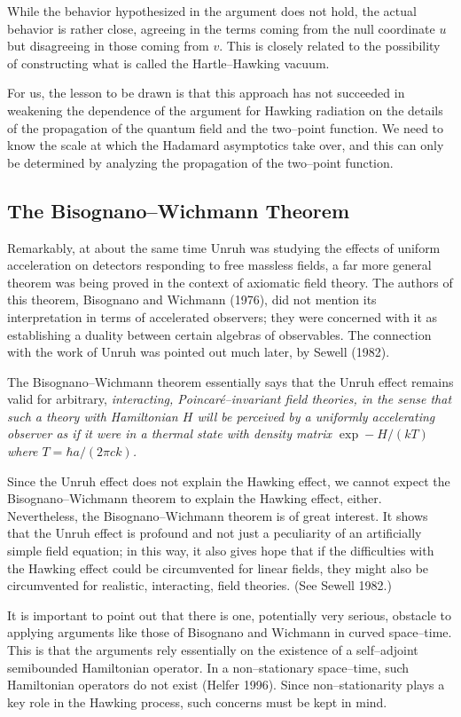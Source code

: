 While the behavior hypothesized in the argument 
does not hold, the actual behavior
is rather close, agreeing in the terms coming from the null coordinate $u$ but
disagreeing in those coming from $v$.  This is closely related to the
possibility of constructing what is called the Hartle--Hawking vacuum.

For us, the lesson to be drawn is that this approach has not succeeded in
weakening the dependence of the argument for Hawking radiation on the details
of the propagation of the quantum field and the two--point function.  We need
to know the scale at which the Hadamard asymptotics take over, and this can
only be determined by analyzing the propagation of the two--point function.
	   
\subsection{The Bisognano--Wichmann Theorem}

Remarkably, at about the same time Unruh was studying the effects of
uniform acceleration on detectors responding to free massless fields,
a far more general theorem was being proved in the context of axiomatic
field theory.  The authors of this theorem, Bisognano and Wichmann (1976),
did not mention its interpretation in terms of accelerated observers;
they were concerned with it as establishing a duality between certain
algebras of observables.  The connection with the work of Unruh was
pointed out much later, by Sewell (1982).  

The Bisognano--Wichmann theorem essentially says that the Unruh effect remains
valid for arbitrary, \it interacting, \rm Poincar\'e--invariant field theories,
in the sense that such a theory with Hamiltonian $H$ will be perceived by a
uniformly accelerating observer as if it were in a thermal state with density
matrix $\exp -H/(kT)$ where $T=\hbar a/(2\pi ck)$.

Since the Unruh effect does not explain the Hawking effect, we cannot expect
the Bisognano--Wichmann theorem to explain the Hawking effect, either. 
Nevertheless, the Bisognano--Wichmann theorem is of great interest.  It shows
that the Unruh effect is profound and not just a peculiarity of an artificially
simple field equation; in this way, it also gives hope that if the difficulties
with the Hawking effect could be circumvented for linear fields, they might
also be circumvented for realistic, interacting, field theories.  (See Sewell
1982.)

It is important to point out that there is one, potentially very serious,
obstacle to applying arguments like those of Bisognano and Wichmann in curved
space--time.  This is that the arguments rely essentially on the existence of a
self--adjoint semibounded Hamiltonian operator.  In a non--stationary
space--time, such Hamiltonian operators do not exist (Helfer 1996).  Since
non--stationarity  plays a key role in the Hawking process, such concerns must
be kept in mind.

